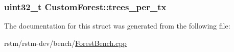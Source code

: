 \hypertarget{structCustomForest_a2f890aea4e4375743240e33ba940e0d6}{
\subsubsection[{trees\-\_\-per\-\_\-tx}]{\setlength{\rightskip}{0pt plus 5cm}uint32\-\_\-t Custom\-Forest\-::trees\-\_\-per\-\_\-tx}}\label{structCustomForest_a2f890aea4e4375743240e33ba940e0d6}


The documentation for this struct was generated from the following file\-:\begin{DoxyCompactItemize}
\item 
rstm/rstm-\/dev/bench/\hyperlink{ForestBench_8cpp}{Forest\-Bench.\-cpp}\end{DoxyCompactItemize}
